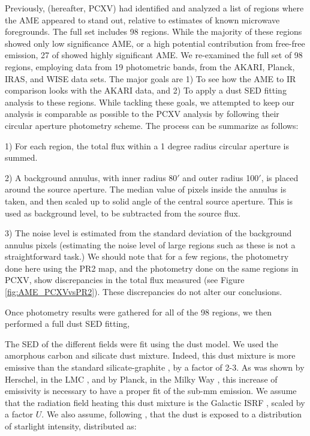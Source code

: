 \documentclass[preprint2,longabstract]{aastex}
\begin{document}
     Previously, \cite{planckXV} (hereafter, PCXV) had identified and analyzed a list of regions where the AME appeared to stand out, relative to estimates of known microwave foregrounds. The full set includes 98 regions. While the majority of these regions showed only low significance AME, or a high potential contribution from free-free emission, 27 of showed highly significant AME. We re-examined the full set of 98 regions, employing data from 19 photometric bands, from the AKARI, Planck, IRAS, and WISE data sets. The major goals are 1) To see how the AME to IR comparison looks with the AKARI data, and 2) To apply a dust SED fitting analysis to these regions. While tackling these goals, we attempted to keep our analysis is comparable as possible to the PCXV analysis by following their circular aperture photometry scheme. The process can be summarize as follows:

     1) For each region, the total flux within a 1 degree radius circular aperture is summed.

     2) A background annulus, with inner radius 80$'$ and outer radius 100$'$, is placed around the source aperture. The median value of pixels inside the annulus is taken, and then scaled up to solid angle of the central source aperture. This is used as background level, to be subtracted from the source flux.

     3) The noise level is estimated from the standard deviation of the background annulus pixels (estimating the noise level of large regions such as these is not a straightforward task.) We should note that for a few regions, the photometry done here using the PR2 map, and the photometry done on the same regions in PCXV, show discrepancies in the total flux measured (see Figure \ref{fig:AME_PCXVvsPR2}). These discrepancies do not alter our conclusions.

     Once photometry results were gathered for all of the 98 regions, we then performed a full dust SED fitting,

The SED of the different fields were fit using the \cite{galliano11} dust model. We used the amorphous carbon and silicate dust mixture. Indeed, this dust mixture is more emissive than the standard silicate-graphite \citep{draine07}, by a factor of 2-3. As was shown by Herschel, in the LMC \citep{galliano11}, and by Planck, in the Milky Way \citep{planck16}, this increase of emissivity is necessary to have a proper fit of the sub-mm emission. We assume that the radiation field heating this dust mixture is the Galactic ISRF \citep{math83}, scaled by a factor $U$. We also assume, following \cite{dale01}, that the dust is exposed to a distribution of starlight intensity, distributed as:
\end{document}
